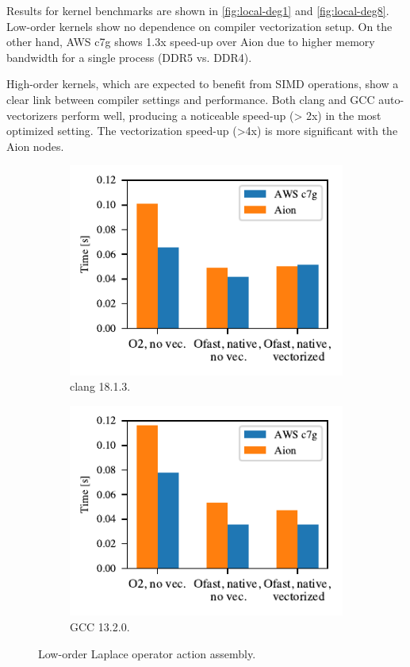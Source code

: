 Results for kernel benchmarks are shown in \autoref{fig:local-deg1} and
\autoref{fig:local-deg8}. Low-order kernels show no dependence on compiler
vectorization setup. On the other hand, AWS c7g shows 1.3x speed-up over
Aion due to higher memory bandwidth for a single process (DDR5 vs. DDR4).

High-order kernels, which are expected to benefit from SIMD operations, show a
clear link between compiler settings and performance. Both clang and GCC
auto-vectorizers perform well, producing a noticeable speed-up (\textgreater
2x) in the most optimized setting. The vectorization speed-up (\textgreater 4x)
is more significant with the Aion nodes.

\begin{figure}
    \begin{subfigure}{.5\textwidth}
        \centering
        \includegraphics{chapters/chp1/graphics/kernel_plots/local_operator_clang_deg1.pdf}
        \caption{clang 18.1.3.}
        \label{fig:local-clang-deg1}
    \end{subfigure}%
    \begin{subfigure}{.5\textwidth}
        \centering
        \includegraphics{chapters/chp1/graphics/kernel_plots/local_operator_gcc_deg1.pdf}
        \caption{GCC 13.2.0.}
        \label{fig:local-gcc-deg1}
    \end{subfigure}
    \caption{Low-order Laplace operator action assembly.}
    \label{fig:local-deg1}
\end{figure}

